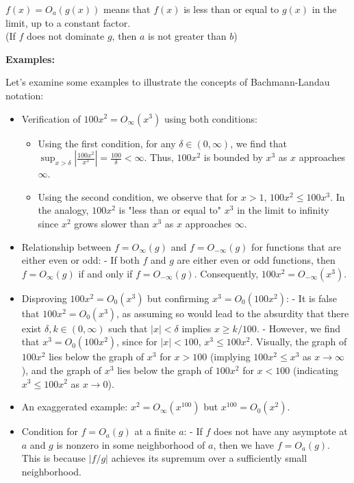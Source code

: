 \documentclass[9pt]{report}
\theoremstyle{definition}
\newcommand\abs[1]{\left\lvert#1\right\rvert}
\begin{document}
\begin{center}
\(f(x) = O_a(g(x))\) means that \(f(x)\) is less than or equal to \(g(x)\) in the limit, up to a constant factor. \\
(If \(f\) does not dominate \(g\), then \(a\) is not greater than \(b\))
\end{center}

\textbf{Examples:}

Let's examine some examples to illustrate the concepts of Bachmann-Landau notation:
\begin{itemize}
    \item  Verification of \(100x^2 = O_{\infty}(x^3)\) using both conditions:
    \begin{itemize}
        \item Using the first condition, for any \(\delta\in(0,\infty)\), we find that \(\sup_{x>\delta}\abs{\frac{100x^2}{x^3}} = \frac{100}{\delta} < \infty\). Thus, \(100x^2\) is bounded by \(x^3\) as \(x\) approaches \(\infty\).
        \item Using the second condition, we observe that for \(x>1\), \(100x^2 \leq 100x^3\). In the analogy, \(100x^2\) is "less than or equal to" \(x^3\) in the limit to infinity since \(x^2\) grows slower than \(x^3\) as \(x\) approaches \(\infty\).
\end{itemize}

\item Relationship between \(f = O_{\infty}(g)\) and \(f = O_{-\infty}(g)\) for functions that are either even or odd:
   - If both \(f\) and \(g\) are either even or odd functions, then \(f = O_{\infty}(g)\) if and only if \(f = O_{-\infty}(g)\). Consequently, \(100x^2 = O_{-\infty}(x^3)\).

\item Disproving \(100x^2 = O_0(x^3)\) but confirming \(x^3 = O_0(100x^2)\):
   - It is false that \(100x^2 = O_0(x^3)\), as assuming so would lead to the absurdity that there exist \(\delta, k \in (0,\infty)\) such that \(\abs{x} < \delta\) implies \(x \geq k/100\).
   - However, we find that \(x^3 = O_0(100x^2)\), since for \(\abs{x} < 100\), \(x^3 \leq 100x^2\). Visually, the graph of \(100x^2\) lies below the graph of \(x^3\) for \(x > 100\) (implying \(100x^2 \leq x^3\) as \(x \to \infty\)), and the graph of \(x^3\) lies below the graph of \(100x^2\) for \(x < 100\) (indicating \(x^3 \leq 100x^2\) as \(x \to 0\)).

\item An exaggerated example: \(x^2 = O_{\infty}(x^{100})\) but \(x^{100} = O_0(x^2)\).

\item Condition for \(f = O_a(g)\) at a finite \(a\):
   - If \(f\) does not have any asymptote at \(a\) and \(g\) is nonzero in some neighborhood of \(a\), then we have \(f = O_a(g)\). This is because \(\abs{f/g}\) achieves its supremum over a sufficiently small neighborhood.

\end{itemize}
\end{document}

